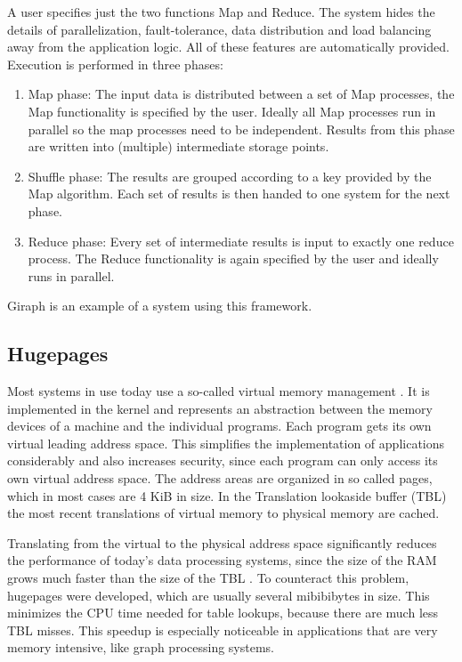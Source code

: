 A user specifies just the two functions Map and Reduce.
The system hides the details of parallelization, fault-tolerance, data distribution and load balancing away from the application logic.
All of these features are automatically provided.
Execution is performed in three phases:
\begin{enumerate}
	\item Map phase: The input data is distributed between a set of Map processes, the Map functionality is specified by the user. Ideally all Map processes run in parallel so the map processes need to be independent. Results from this phase are written into (multiple) intermediate storage points.
	\item Shuffle phase: The results are grouped according to a key provided by the Map algorithm. Each set of results is then handed to one system for the next phase.
	\item Reduce phase: Every set of intermediate results is input to exactly one reduce process. The Reduce functionality is again specified by the user and ideally runs in parallel.
\end{enumerate}
Giraph \cite{Giraph} is an example of a system using this framework.

\subsection{Hugepages}
Most systems in use today use a so-called virtual memory management \cite{virtual_memory}.
It is implemented in the kernel and represents an abstraction between the memory devices of a machine and the individual programs.
Each program gets its own virtual leading address space.
This simplifies the implementation of applications considerably and also increases security, since each program can only access its own virtual address space.
The address areas are organized in so called pages, which in most cases are 4 KiB in size.
In the Translation lookaside buffer (TBL) the most recent translations of virtual memory to physical memory are cached.

Translating from the virtual to the physical address space significantly reduces the performance of today's data processing systems, since the size of the RAM grows much faster than the size of the TBL \cite{hugepages, superpages}.
To counteract this problem, hugepages were developed, which are usually several mibibibytes in size.
This minimizes the CPU time needed for table lookups, because there are much less TBL misses.
This speedup is especially noticeable in applications that are very memory intensive, like graph processing systems.


